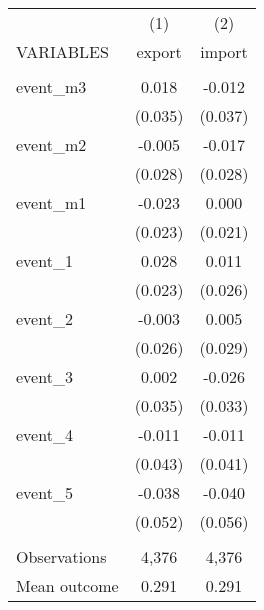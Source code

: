 \begin{tabular}{lcc} \hline
 & (1) & (2) \\
VARIABLES & export & import \\ \hline
 &  &  \\
event\_m3 & 0.018 & -0.012 \\
 & (0.035) & (0.037) \\
event\_m2 & -0.005 & -0.017 \\
 & (0.028) & (0.028) \\
event\_m1 & -0.023 & 0.000 \\
 & (0.023) & (0.021) \\
event\_1 & 0.028 & 0.011 \\
 & (0.023) & (0.026) \\
event\_2 & -0.003 & 0.005 \\
 & (0.026) & (0.029) \\
event\_3 & 0.002 & -0.026 \\
 & (0.035) & (0.033) \\
event\_4 & -0.011 & -0.011 \\
 & (0.043) & (0.041) \\
event\_5 & -0.038 & -0.040 \\
 & (0.052) & (0.056) \\
 &  &  \\
Observations & 4,376 & 4,376 \\
 Mean outcome & 0.291 & 0.291 \\ \hline
\end{tabular}

